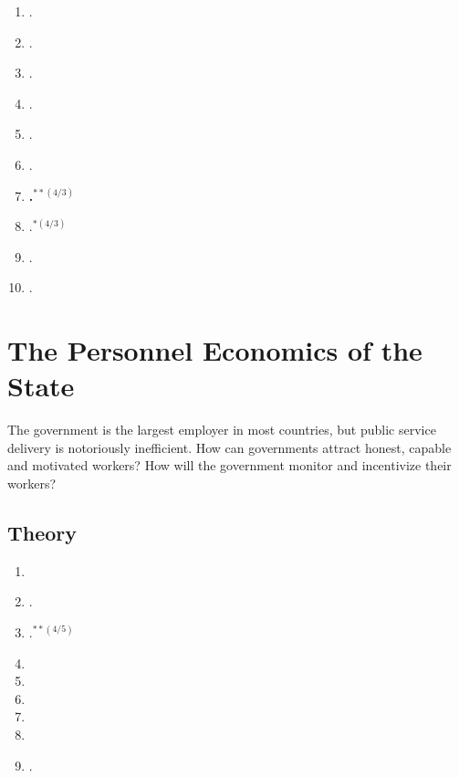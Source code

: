 \documentclass[11pt]{article}
\begin{document}
\begin{enumerate}
\item {}.
\item {}.
\item {}.
\item {}.
\item {}.
\item {}.
\item \textbf{.$^{**(4/3)}$}
\item {}.$^{*(4/3)}$
\item {}.
\item {}.
\end{enumerate}

\section{The Personnel Economics of the State}
The government is the largest employer in most countries, but public service delivery is notoriously inefficient. How can governments attract honest, capable and motivated workers? How will the government monitor and incentivize their workers?


\subsection{Theory}

\begin{enumerate}
\item {}
\item \textbf{}.
\item {}.$^{**(4/5)}$
\item {}
\item {}
\item {}
\item {}
\item {}
\item {}.
\end{enumerate}
\end{document}
